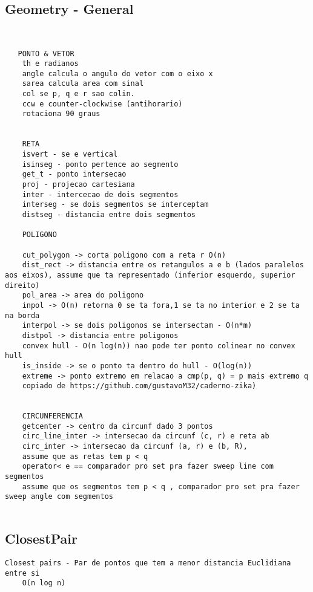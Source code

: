 \subsection{Geometry - General}
\vspace{-4pt}
\begin{lstlisting}[style=description]


   PONTO & VETOR
    th e radianos
    angle calcula o angulo do vetor com o eixo x
    sarea calcula area com sinal
    col se p, q e r sao colin.
    ccw e counter-clockwise (antihorario)
    rotaciona 90 graus


    RETA
    isvert - se e vertical
    isinseg - ponto pertence ao segmento
    get_t - ponto intersecao
    proj - projecao cartesiana
    inter - intercecao de dois segmentos
    interseg - se dois segmentos se interceptam
    distseg - distancia entre dois segmentos

    POLIGONO

    cut_polygon -> corta poligono com a reta r O(n)
    dist_rect -> distancia entre os retangulos a e b (lados paralelos aos eixos), assume que ta representado (inferior esquerdo, superior direito)
    pol_area -> area do poligono
    inpol -> O(n) retorna 0 se ta fora,1 se ta no interior e 2 se ta na borda
    interpol -> se dois poligonos se intersectam - O(n*m)
    distpol -> distancia entre poligonos
    convex hull - O(n log(n)) nao pode ter ponto colinear no convex hull
    is_inside -> se o ponto ta dentro do hull - O(log(n))
    extreme -> ponto extremo em relacao a cmp(p, q) = p mais extremo q
    copiado de https://github.com/gustavoM32/caderno-zika)
    
    
    CIRCUNFERENCIA
    getcenter -> centro da circunf dado 3 pontos
    circ_line_inter -> intersecao da circunf (c, r) e reta ab
    circ_inter -> intersecao da circunf (a, r) e (b, R),
    assume que as retas tem p < q
    operator< e == comparador pro set pra fazer sweep line com segmentos
    assume que os segmentos tem p < q , comparador pro set pra fazer sweep angle com segmentos


\end{lstlisting}
\vspace{-5pt}
\raggedbottom
\hrulefill

\vspace{-2pt}
\subsection{ClosestPair}
\vspace{-4pt}
\begin{lstlisting}[style=description]
    Closest pairs - Par de pontos que tem a menor distancia Euclidiana entre si
    O(n log n)

\end{lstlisting}
\vspace{-5pt}
\raggedbottom
\hrulefill

